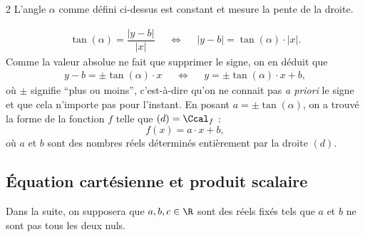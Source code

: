 \begin{multicols}{2}
L'angle $\alpha$ comme défini ci-dessus est constant et mesure la pente de la droite.

	\begin{align*}
		\tan(\alpha) = \dfrac{|y-b|}{|x|} && \iff && |y-b| = \tan(\alpha) \cdot |x|.
	\end{align*}
Comme la valeur absolue ne fait que supprimer le signe, on en déduit que
	\begin{align*}
		y - b = \pm \tan(\alpha) \cdot x && \iff && y = \pm \tan(\alpha) \cdot x + b,
	\end{align*}
où $\pm$ signifie ``plus ou moins'', c'est-à-dire qu'on ne connait pas \emph{a priori} le signe et que cela n'importe pas pour l'instant.
En posant $a = \pm \tan(\alpha)$, on a trouvé la forme de la fonction $f$ telle que $(d) = \Ccal_f$ :
	\[ f(x) = a\cdot x + b, \]
où $a$ et $b$ sont des nombres réels déterminés entièrement par la droite $(d)$.


	
\end{multicols}

\newpage


\subsection{Équation cartésienne et produit scalaire}

Dans la suite, on supposera que $a, b, c\in\R$ sont des réels fixés tels que $a$ et $b$ ne sont pas tous les deux nuls.




